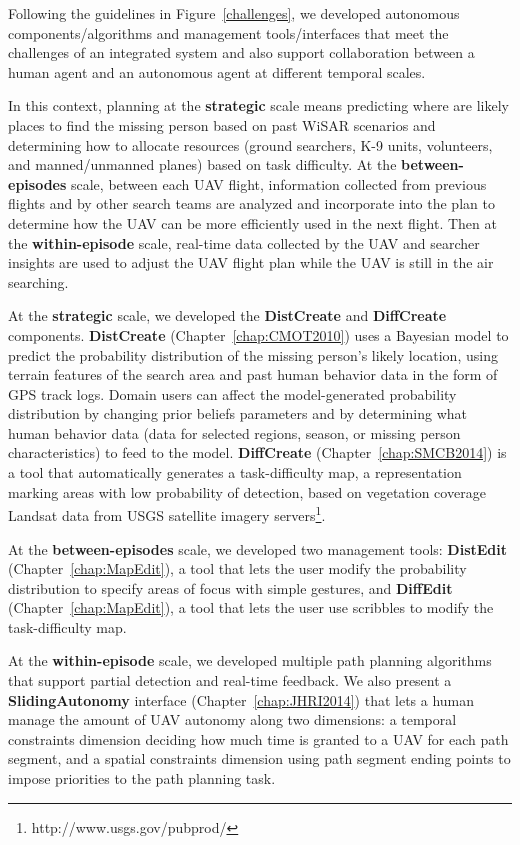 Following the guidelines in Figure~\ref{challenges}, we developed autonomous components/algorithms and management tools/interfaces that meet the challenges of an integrated system and also support collaboration between a human agent and an autonomous agent at different temporal scales.

In this context, planning at the \textbf{strategic} scale means predicting where are likely places to find the missing person based on past WiSAR scenarios and determining how to allocate resources (ground searchers, K-9 units, volunteers, and manned/unmanned planes) based on task difficulty. At the \textbf{between-episodes} scale, between each UAV flight, information collected from previous flights and by other search teams are analyzed and incorporate into the plan to determine how the UAV can be more efficiently used in the next flight. Then at the \textbf{within-episode} scale, real-time data collected by the UAV and searcher insights are used to adjust the UAV flight plan while the UAV is still in the air searching.

At the \textbf{strategic} scale, we developed the \textbf{DistCreate} and \textbf{DiffCreate} components. \textbf{DistCreate} (Chapter~\ref{chap:CMOT2010}) uses a Bayesian model to predict the probability distribution of the missing person's likely location, using terrain features of the search area and past human behavior data in the form of GPS track logs. Domain users can affect the model-generated probability distribution by changing prior beliefs parameters and by determining what human behavior data (data for selected regions, season, or missing person characteristics) to feed to the model. \textbf{DiffCreate} (Chapter~\ref{chap:SMCB2014}) is a tool that automatically generates a task-difficulty map, a representation marking areas with low probability of detection, based on vegetation coverage Landsat data from USGS satellite imagery servers\footnote{http://www.usgs.gov/pubprod/}. 

At the \textbf{between-episodes} scale, we developed two management tools: \textbf{DistEdit} (Chapter~\ref{chap:MapEdit}), a tool that lets the user modify the probability distribution to specify areas of focus with simple gestures, and \textbf{DiffEdit} (Chapter~\ref{chap:MapEdit}), a tool that lets the user use scribbles to modify the task-difficulty map. 

At the \textbf{within-episode} scale, we developed multiple path planning algorithms that support partial detection and real-time feedback. We also present a \textbf{SlidingAutonomy} interface (Chapter~\ref{chap:JHRI2014}) that lets a human manage the amount of UAV autonomy along two dimensions: a temporal constraints dimension deciding how much time is granted to a UAV for each path segment, and a spatial constraints dimension using path segment ending points to impose priorities to the path planning task.


